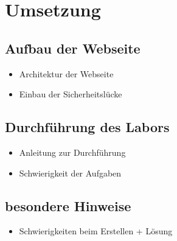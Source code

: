 \chapter{Umsetzung}
\section{Aufbau der Webseite}
\begin{itemize}
	\item Architektur der Webseite
	\item Einbau der Sicherheitslücke
\end{itemize}
\section{Durchführung des Labors}
\begin{itemize}
	\item Anleitung zur Durchführung 
	\item Schwierigkeit der Aufgaben
	
\end{itemize}
\section{besondere Hinweise}
\begin{itemize}
	\item Schwierigkeiten beim Erstellen + Lösung
\end{itemize}